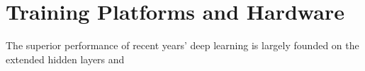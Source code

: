\section{Training Platforms and Hardware}
The superior performance of recent years' deep learning is largely founded on the extended hidden layers and 